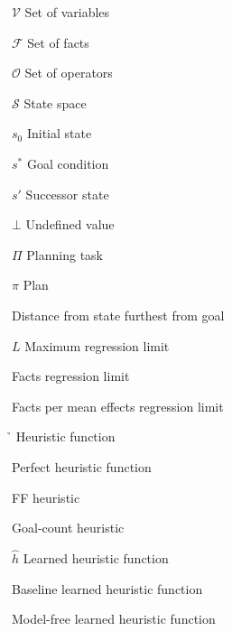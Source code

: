 \begin{listofsymbols}{\hgc}
    \item[$\mathcal{V}$] Set of variables
    \item[$\mathcal{F}$] Set of facts
    \item[$\mathcal{O}$] Set of operators
    \item[$\mathcal{S}$] State space
    \item[$s_0$] Initial state
    \item[$s^*$] Goal condition
    \item[$s'$] Successor state
    \item[$\bot$] Undefined value
    \item[$\Pi$] Planning task
    \item[$\pi$] Plan
    \item[\ssdiameter] Distance from state furthest from goal
    \item[$L$] Maximum regression limit
    \item[\facts] Facts regression limit
    \item[\meanfx] Facts per mean effects regression limit
    \item[\h] Heuristic function
    \item[\hstar] Perfect heuristic function
    \item[\hff] FF heuristic
    \item[\hgc] Goal-count heuristic
    \item[$\hat h$] Learned heuristic function
    \item[\hnnbase] Baseline learned heuristic function
    \item[\hnnnomutex] Model-free learned heuristic function
\end{listofsymbols}
